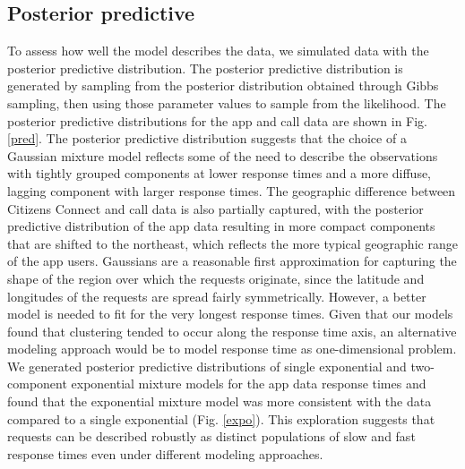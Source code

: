 \documentclass[twoside]{article}
\theoremstyle{theorem}
\theoremstyle{theorem}
\theoremstyle{theorem}
\theoremstyle{lemma}
\theoremstyle{definition}
\theoremstyle{example}
\begin{document}
\subsection{Posterior predictive}
To assess how well the model describes the data, we simulated data with the posterior predictive distribution. The posterior predictive distribution is generated by sampling from the posterior distribution obtained through Gibbs sampling, then using those parameter values to sample from the likelihood. The posterior predictive distributions for the app and call data are shown in Fig. \ref{pred}. The posterior predictive distribution suggests that the choice of a Gaussian mixture model reflects some of the need to describe the observations with tightly grouped components at lower response times and a more diffuse, lagging component with larger response times. The geographic difference between Citizens Connect and call data is also partially captured, with the posterior predictive distribution of the app data resulting in more compact components that are shifted to the northeast, which reflects the more typical geographic range of the app users. Gaussians are a reasonable first approximation for capturing the shape of the region over which the requests originate, since the latitude and longitudes of the requests are spread fairly symmetrically. However, a better model is needed to fit for the very longest response times. Given that our models found that clustering tended to occur along the response time axis, an alternative modeling approach would be to model response time as one-dimensional problem. We generated posterior predictive distributions of single exponential and two-component exponential mixture models for the app data response times and found that the exponential mixture model was more consistent with the data compared to a single exponential (Fig. \ref{expo}). This exploration suggests that requests can be described robustly as distinct populations of slow and fast response times even under different modeling approaches. 
\end{document}
